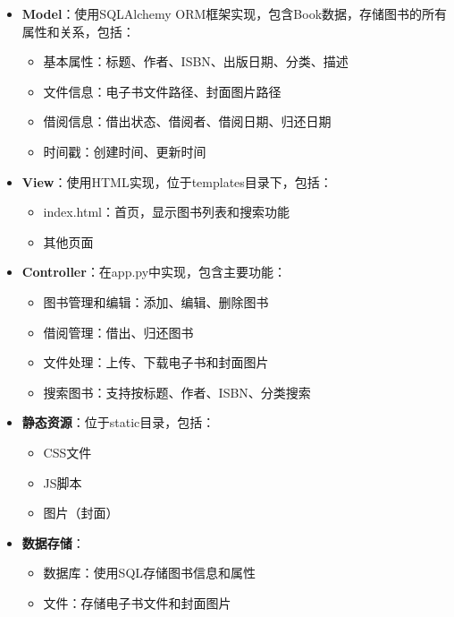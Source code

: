 \documentclass{SYSUReport}
\begin{document}
\begin{itemize}
    \item \textbf{Model}：使用SQLAlchemy ORM框架实现，包含Book数据，存储图书的所有属性和关系，包括：
    \begin{itemize}
        \item 基本属性：标题、作者、ISBN、出版日期、分类、描述
        \item 文件信息：电子书文件路径、封面图片路径
        \item 借阅信息：借出状态、借阅者、借阅日期、归还日期
        \item 时间戳：创建时间、更新时间
    \end{itemize}
    
    \item \textbf{View}：使用HTML实现，位于templates目录下，包括：
    \begin{itemize}
        \item index.html：首页，显示图书列表和搜索功能
        \item 其他页面
    \end{itemize}
    
    \item \textbf{Controller}：在app.py中实现，包含主要功能：
    \begin{itemize}
        \item 图书管理和编辑：添加、编辑、删除图书
        \item 借阅管理：借出、归还图书
        \item 文件处理：上传、下载电子书和封面图片
        \item 搜索图书：支持按标题、作者、ISBN、分类搜索
    \end{itemize}
    
    \item \textbf{静态资源}：位于static目录，包括：
    \begin{itemize}
        \item CSS文件
        \item JS脚本
        \item 图片（封面）
    \end{itemize}
    
    \item \textbf{数据存储}：
    \begin{itemize}
        \item 数据库：使用SQL存储图书信息和属性
        \item 文件：存储电子书文件和封面图片
    \end{itemize}
\end{itemize}
\end{document}
